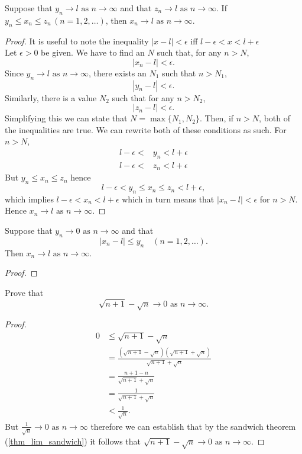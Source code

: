 \documentclass[10pt, a4paper]{article}
\newcommand{\limas}[3][n]{#2 \rightarrow #3 \text{ as } #1 \rightarrow \infty}
\begin{document}
\begin{theorem}\label{thm_lim_sandwich}
    Suppose that $\limas{y_n}{l}$ and that $\limas{z_n}{l}$. If $y_n \leq x_n \leq z_n\,(n = 1, 2, \dots)$, then $\limas{x_n}{l}$.
    \begin{proof}
        It is useful to note the inequality $|x - l| < \epsilon$ iff $l - \epsilon < x < l + \epsilon$ \\
        Let $\epsilon > 0$ be given. We have to find an $N$ such that, for any $n > N$,
        $$|x_n - l| < \epsilon.$$
        Since $\limas{y_n}{l}$, there exists an $N_1$ such that $n > N_1$,
        $$|y_n - l| < \epsilon.$$
        Similarly, there is a value $N_2$ such that for any $n > N_2$,
        $$|z_n - l| < \epsilon.$$
        Simplifying this we can state that $N = \max{\{N_1, N_2\}}$. Then, if $n > N$, both of the inequalities are true. We can rewrite both of these conditions as such. For $n > N$,
        \begin{align*}
            l - \epsilon < &y_n < l + \epsilon \\
            l - \epsilon < &z_n < l + \epsilon
        \end{align*}
        But $y_n \leq x_n \leq z_n$ hence
        $$l - \epsilon < y_n \leq x_n \leq z_n < l + \epsilon,$$
        which implies $l - \epsilon < x_n < l + \epsilon$ which in turn means that $|x_n - l| < \epsilon$ for $n > N$. Hence $\limas{x_n}{l}$.
    \end{proof}
\end{theorem}

\begin{corollary}
    Suppose that $\limas{y_n}{0}$ and that
    $$|x_n - l| \leq y_n\quad(n = 1, 2, \dots).$$
    Then $\limas{x_n}{l}$.
    \begin{proof}
        
    \end{proof}
\end{corollary}

\begin{example}\label{examp_sand1}
    Prove that $$\limas{\sqrt{n + 1} - \sqrt{n}}{0}.$$
    \begin{proof}
        \begin{align*}
            0 &\leq \sqrt{n + 1} - \sqrt{n} \\
            &= \frac{(\sqrt{n + 1} - \sqrt{n})(\sqrt{n + 1} + \sqrt{n})}{\sqrt{n + 1} + \sqrt{n}} \\ 
            &= \frac{n + 1 - n}{\sqrt{n + 1} + \sqrt{n}} \\
            &= \frac{1}{\sqrt{n + 1} + \sqrt{n}} \\
            &< \frac{1}{\sqrt{n}}.
        \end{align*}
        But $\limas{\frac{1}{\sqrt{n}}}{0}$ therefore we can establish that by the sandwich theorem (\autoref{thm_lim_sandwich}) it follows that $\limas{\sqrt{n + 1} - \sqrt{n}}{0}$.
    \end{proof}
\end{example}
\end{document}
